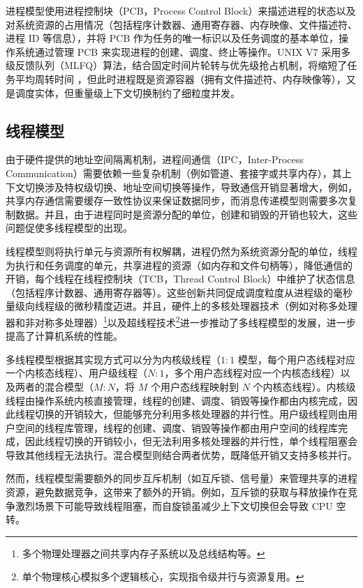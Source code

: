 进程模型使用进程控制块（PCB，Process Control Block）来描述进程的状态以及对系统资源的占用情况（包括程序计数器、通用寄存器、内存映像、文件描述符、进程 ID 等信息），并将 PCB 作为任务的唯一标识以及任务调度的基本单位，操作系统通过管理 PCB 来实现进程的创建、调度、终止等操作。UNIX V7 采用多级反馈队列（MLFQ）算法，结合固定时间片轮转与优先级抢占机制，将缩短了任务平均周转时间 \cite{ritchie1974unix}，但此时进程既是资源容器（拥有文件描述符、内存映像等），又是调度实体，但重量级上下文切换制约了细粒度并发。

\subsection{线程模型}

由于硬件提供的地址空间隔离机制，进程间通信（IPC，Inter-Process Communication）需要依赖一些复杂机制（例如管道、套接字或共享内存），其上下文切换涉及特权级切换、地址空间切换等操作，导致通信开销显著增大，例如，共享内存通信需要缓存一致性协议来保证数据同步，而消息传递模型则需要多次复制数据。并且，由于进程同时是资源分配的单位，创建和销毁的开销也较大，这些问题促使多线程模型的出现。

线程模型则将执行单元与资源所有权解耦，进程仍然为系统资源分配的单位，线程为执行和任务调度的单元，共享进程的资源（如内存和文件句柄等），降低通信的开销，每个线程在线程控制块（TCB，Thread Control Block）中维护了状态信息（包括程序计数器、通用寄存器等）。这些创新共同促成调度粒度从进程级的毫秒量级向线程级的微秒精度迈进。并且，硬件上的多核处理器技术（例如对称多处理器和非对称多处理器）\footnote{多个物理处理器之间共享内存子系统以及总线结构等。}以及超线程技术\footnote{单个物理核心模拟多个逻辑核心，实现指令级并行与资源复用。}进一步推动了多线程模型的发展，进一步提高了计算机系统的性能。

多线程模型根据其实现方式可以分为内核级线程（$1:1$ 模型，每个用户态线程对应一个内核态线程）、用户级线程（$N:1$，多个用户态线程对应一个内核态线程）以及两者的混合模型（$M:N$，将 $M$ 个用户态线程映射到 $N$ 个内核态线程）。内核级线程由操作系统内核直接管理，线程的创建、调度、销毁等操作都由内核完成，因此线程切换的开销较大，但能够充分利用多核处理器的并行性。用户级线程则由用户空间的线程库管理，线程的创建、调度、销毁等操作都由用户空间的线程库完成，因此线程切换的开销较小，但无法利用多核处理器的并行性，单个线程阻塞会导致其他线程无法执行。混合模型则结合两者优势，既降低开销又支持多核并行。

然而，线程模型需要额外的同步互斥机制（如互斥锁、信号量）来管理共享的进程资源，避免数据竞争，这带来了额外的开销。例如，互斥锁的获取与释放操作在竞争激烈场景下可能导致线程阻塞，而自旋锁虽减少上下文切换但会导致 CPU 空转。

